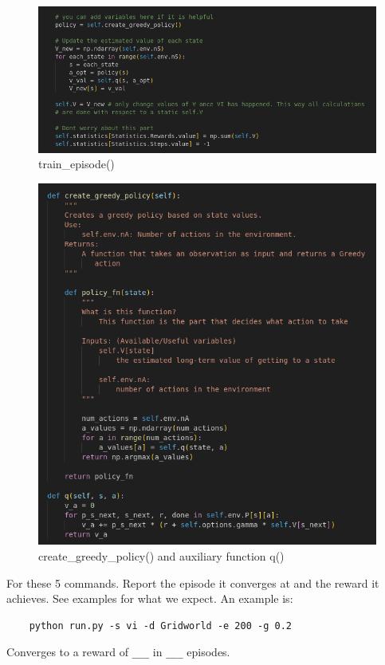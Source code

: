 \documentclass[a4paper]{article}
\theoremstyle{definition}
\begin{document}
\begin{figure}[H]
    \centering
    \includegraphics[width=6in]{2_train_episode.png}
    \caption{train\_episode()}
    \label{fig:gan_q1_loss}
\end{figure}

\begin{figure}[H]
    \centering
    \includegraphics[width=6in]{2_create_greedy_policy.png}
    \caption{create\_greedy\_policy() and auxiliary function q()}
    \label{fig:gan_q1_loss}
\end{figure}


\vspace{5mm}
For these 5 commands. Report the episode it converges at and the reward it achieves. See examples for what we expect. An example is: \begin{verbatim}
    python run.py -s vi -d Gridworld -e 200 -g 0.2
\end{verbatim}
Converges to a reward of \verb|___| in \verb|___| episodes.
\end{document}
